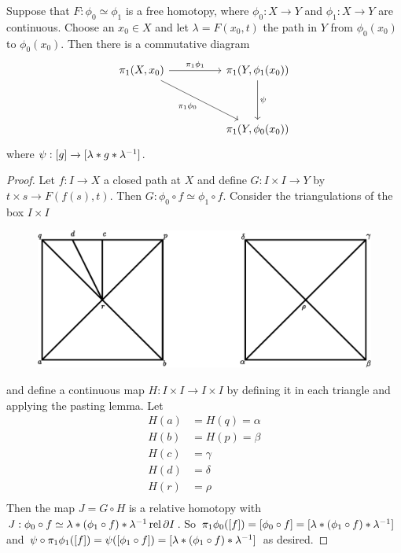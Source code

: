 \begin{lemma}\label{4.2.5}
    Suppose that $F:\phi_0 \simeq \phi_1$ is a free homotopy, where $\phi_0:X
    \xrightarrow{} Y$ and $\phi_1:X \xrightarrow{} Y$ are continuous. Choose an
    $x_0 \in X$ and let $\lambda=F(x_0,t)$ the path in $Y$ from $\phi_0(x_0)$ to
    $\phi_0(x_0)$. Then there is a commutative diagram
    \[\begin{tikzcd}
        {\pi_1(X,x_0)} && {\pi_1(Y,\phi_1(x_0))} \\
        \\
        && {\pi_1(Y,\phi_0(x_0))}
        \arrow["{\pi_1{\phi_1}}", from=1-1, to=1-3]
        \arrow["\psi", from=1-3, to=3-3]
        \arrow["{\pi_1{\phi_0}}"', from=1-1, to=3-3]
    \end{tikzcd}\]
    where $\psi:[g] \xrightarrow{} [\lambda \ast g \ast \lambda^{-1}]$.
\end{lemma}
\begin{proof}
    Let $f:I \xrightarrow{} X$ a closed path at $X$ and define  $G:I \times I
    \xrightarrow{} Y$ by $t \times s \xrightarrow{} F(f(s),t)$. Then $G:\phi_0
    \circ f \simeq \phi_1 \circ f$. Consider the triangulations of the box $I
    \times I$
     \begin{figure}[h]
        \centering
        \includegraphics[scale=0.8]{Figures/Chapter4/affine_box.eps}
        \caption{}
        \label{}
    \end{figure}
    and define a continuous map $H:I \times I \xrightarrow{} I \times I$ by
    defining it in each triangle and applying the pasting lemma. Let
    \begin{align*}
        H(a)    &=  H(q)=\alpha \\
        H(b)    &=  H(p)=\beta \\
        H(c)    &=  \gamma \\
        H(d)    &=  \delta \\
        H(r)    &=  \rho \\
    \end{align*}
    Then the map $J=G \circ  H$ is a relative homotopy with  $J:\phi_0 \circ f
    \simeq \lambda \ast (\phi_1 \circ f) \ast \lambda^{-1} \operatorname{rel}{\partial{I}}$.
    So $\pi_1{\phi_0}([f])=[\phi_0 \circ f]=[\lambda \ast (\phi_1 \circ f) \ast
    \lambda^{-1}]$ and $\psi \circ \pi_1{\phi_1}([f])=\psi([\phi_1 \circ
f])=[\lambda \ast (\phi_1 \circ f) \ast \lambda^{-1}]$ as desired.
\end{proof}
